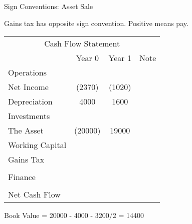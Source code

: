 \documentclass[ignorenonframetext,]{beamer}
\begin{document}
\begin{frame}{Sign Conventions: Asset Sale}

Gains tax has opposite sign convention. Positive means pay.

\begin{table}
\begin{tabular}{l||c|c||p{3cm}}
        \multicolumn{4}{c}{Cash Flow Statement}\\
  &Year 0  &Year 1  &Note\\        
    Operations& &   &\\
    \hspace{.25in}Net Income    &   (2370)& (1020)&\\
    \hspace{.25in}Depreciation  &   4000&   1600&\\
    Investments &   &   &\\
\hspace{.25in}The Asset         &(20000)    &   19000&\\
\hspace{.25in}Working Capital   &   &   &\\
        \hspace{.25in}Gains Tax &   &   &\\
            &   &   &\\
        
    Finance &   &   &\\
            &   &   &\\
        \hline
        Net Cash Flow   &   &   &\\
\end{tabular}
\end{table}

Book Value = 20000 - 4000 - 3200/2 = 14400

\end{frame}
\end{document}
